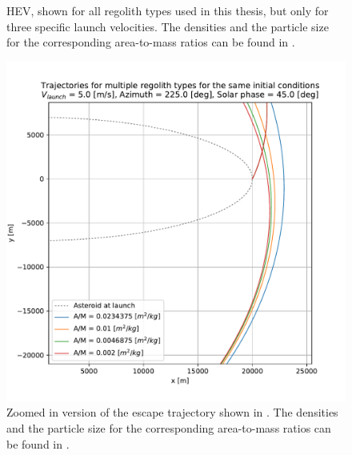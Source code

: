 \documentclass[print]{tudelft-report}
\begin{document}
\begin{appendices}
\begin{figure}[htb]
    \caption{\gls{HEV}, shown for all regolith types used in this thesis, but only for three specific launch velocities. The densities and the particle size for the corresponding area-to-mass ratios can be found in .}
    \label{fig:longestEdge_allParticles_escape_hev_solarPhase315}
    \end{figure}
    \FloatBarrier
    \begin{figure}[htb]
    \centering
    \captionsetup{justification=centering}
    \includegraphics[width=\textwidth, height=0.5\textheight, keepaspectratio=true]{Results/Images/longest_edge_perturbations/multiple_regolith_types/escape_traj_5ms_225Azim_45solarPhase_zoomed.pdf}
    \caption{Zoomed in version of the escape trajectory shown in . The densities and the particle size for the corresponding area-to-mass ratios can be found in .}
    \label{fig:escape_traj_allParticles_5ms_225Azim_45solarPhase_zoomed}
    \end{figure}
    \FloatBarrier
    \begin{figure}[htb]
    \centering
    \captionsetup{justification=centering}

\end{figure}
\end{appendices}
\end{document}
